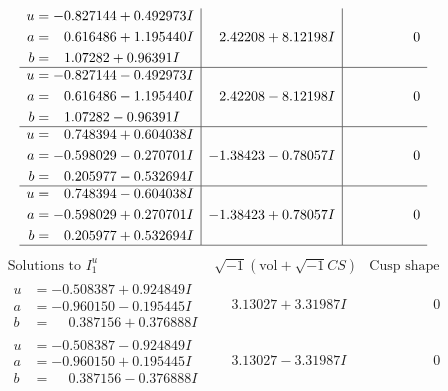 \documentclass[1p]{elsarticle_modified}
\theoremstyle{definition}
\newcommand{\I}{\sqrt{-1}}
\begin{document}
$$\begin{array}{c|c|c}
\begin{aligned}
u &= -0.827144 + 0.492973 I \\
a &= \phantom{-}0.616486 + 1.195440 I \\
b &= \phantom{-}1.07282 + 0.96391 I\end{aligned}
 & \phantom{-}2.42208 + 8.12198 I & \phantom{-0.000000 } 0 \\ \hline\begin{aligned}
u &= -0.827144 - 0.492973 I \\
a &= \phantom{-}0.616486 - 1.195440 I \\
b &= \phantom{-}1.07282 - 0.96391 I\end{aligned}
 & \phantom{-}2.42208 - 8.12198 I & \phantom{-0.000000 } 0 \\ \hline\begin{aligned}
u &= \phantom{-}0.748394 + 0.604038 I \\
a &= -0.598029 - 0.270701 I \\
b &= \phantom{-}0.205977 - 0.532694 I\end{aligned}
 & -1.38423 - 0.78057 I & \phantom{-0.000000 } 0 \\ \hline\begin{aligned}
u &= \phantom{-}0.748394 - 0.604038 I \\
a &= -0.598029 + 0.270701 I \\
b &= \phantom{-}0.205977 + 0.532694 I\end{aligned}
 & -1.38423 + 0.78057 I & \phantom{-0.000000 } 0\\
 \hline 
 \end{array}$$\newpage$$\begin{array}{c|c|c}  
\text{Solutions to }I^u_{1}& \I (\text{vol} + \sqrt{-1}CS) & \text{Cusp shape}\\
 \hline 
\begin{aligned}
u &= -0.508387 + 0.924849 I \\
a &= -0.960150 - 0.195445 I \\
b &= \phantom{-}0.387156 + 0.376888 I\end{aligned}
 & \phantom{-}3.13027 + 3.31987 I & \phantom{-0.000000 } 0 \\ \hline\begin{aligned}
u &= -0.508387 - 0.924849 I \\
a &= -0.960150 + 0.195445 I \\
b &= \phantom{-}0.387156 - 0.376888 I\end{aligned}
 & \phantom{-}3.13027 - 3.31987 I & \phantom{-0.000000 } 0 \\ \hline\begin{aligned}

\end{aligned}
\end{array}$$
\end{document}
